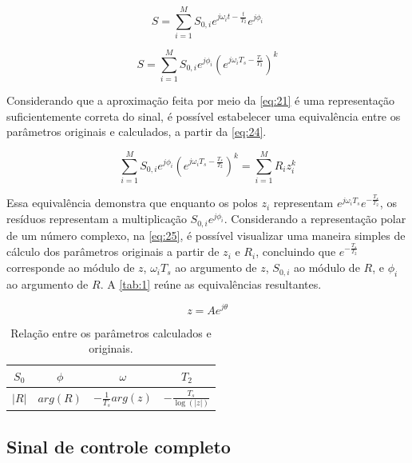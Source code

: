 \documentclass[12pt]{article}
\begin{document}
\begin{equation} \label{eq:22}
    S = \sum_{i=1}^{M} S_{0, i} e^{j\omega_i t -\frac{t}{T_2}}e^{j \phi_i} 
\end{equation}

\begin{equation} \label{eq:23}
    S = \sum_{i=1}^{M} S_{0, i} e^{j \phi_i}  (e^{j\omega_i T_s -\frac{T_s}{T_2}})^k 
\end{equation}

Considerando que a aproximação feita por meio da \autoref{eq:21} é uma representação suficientemente correta do sinal, é possível estabelecer uma equivalência 
entre os parâmetros originais e calculados, a partir da \autoref{eq:24}.

\begin{equation} \label{eq:24}
    \sum_{i=1}^{M} S_{0, i} e^{j \phi_i}  (e^{j\omega_i T_s -\frac{T_s}{T_2}})^k  = \sum_{i = 1}^{M} R_i z_i^{k}
\end{equation}

Essa equivalência demonstra que enquanto os polos $z_i$ representam $e^{j\omega_i T_s} e^{-\frac{T_s}{T_2}}$, os resíduos representam a multiplicação 
$S_{0, i} e^{j \phi_i}$. Considerando a representação polar de um número complexo, na \autoref{eq:25}, é possível visualizar uma maneira simples de 
cálculo dos parâmetros originais a partir de $z_i$ e $R_i$, concluindo que $e^{-\frac{T_s}{T_2}}$ corresponde ao módulo de $z$, $\omega_i T_s$ ao argumento de $z$,
$S_{0, i}$ ao módulo de $R$, e $\phi_i$ ao argumento de $R$. A \autoref{tab:1} reúne as equivalências resultantes.

\begin{equation} \label{eq:25}
    z = A e^{j \theta}    
\end{equation}

\begin{table}[H]
    \centering
    \begin{tabular}{|c|c|c|c|}
        \hline
        $S_0$ & $\phi$ & $\omega$ & $T_2$ \\ 
        \hline
        $|R|$ & $arg(R)$ & $-\frac{1}{T_s} arg(z)$ & $-\frac{T_s}{\log(|z|)}$ \\
        \hline
    \end{tabular}
    \caption{Relação entre os parâmetros calculados e originais.}
    \label{tab:1}
\end{table}

\subsection{Sinal de controle completo} \label{sec:sinal-completo}
\end{document}
